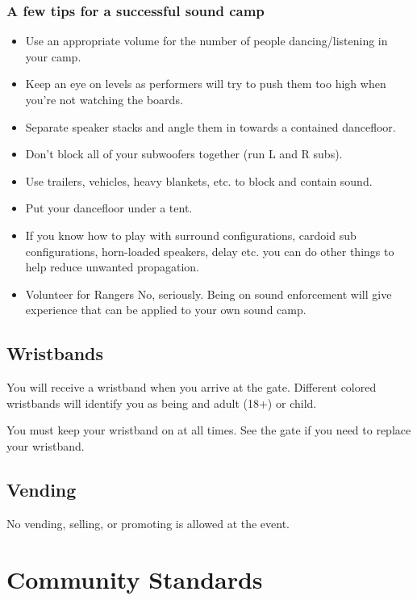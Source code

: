 \subsubsection*{A few tips for a successful sound camp}

\begin{itemize}[noitemsep]
    \item Use an appropriate volume for the number of people dancing/listening in your camp.
    \item Keep an eye on levels as performers will try to push them too high when you're not watching the boards.
    \item Separate speaker stacks and angle them in towards a contained dancefloor.
    \item Don’t block all of your subwoofers together (run L and R subs).
    \item Use trailers, vehicles, heavy blankets, etc. to block and contain sound.
    \item Put your dancefloor under a tent.
    \item If you know how to play with surround configurations, cardoid sub configurations, horn-loaded speakers, delay etc. you can do other things to help reduce unwanted propagation.
    \item Volunteer for Rangers  No, seriously. Being on sound enforcement will give experience that can be applied to your own sound camp.
\end{itemize}



\subsection*{Wristbands}
\label{sub:wristbands}
You will receive a wristband when you arrive at the \gls{gate}.  Different colored wristbands will identify you as being and adult (18+) or child.  %

You must keep your wristband on at all times.  See the \gls{gate} if you need to replace your wristband.

\subsection*{Vending}
No vending, selling, or promoting is allowed at the event.


\section*{Community Standards}

